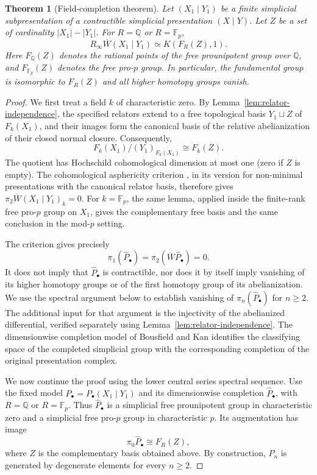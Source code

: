 \documentclass[11pt,a4paper]{article}
\newtheorem{theorem}{Theorem}[section] %
\begin{document}
\begin{theorem}[Field-completion theorem]\label{main}
Let $(X_1\mid Y_1)$ be a finite simplicial subpresentation of a
contractible simplicial presentation $(X\mid Y)$.  Let $Z$ be a set of
cardinality $|X_1|-|Y_1|$.  For $R=\mathbb Q$ or $R=\mathbb F_p$,
\[
 R_\infty\overline W(X_1\mid Y_1)\simeq K(F_R(Z),1).
\]
Here $F_{\mathbb Q}(Z)$ denotes the rational points of the free
prounipotent group over $\mathbb Q$, and $F_{\mathbb F_p}(Z)$ denotes
the free pro-$p$ group.  In particular, the fundamental group is
isomorphic to $F_R(Z)$ and all higher homotopy groups vanish.
\end{theorem}

\begin{proof}
We first treat a field $k$ of characteristic zero.  By
Lemma~\ref{lem:relator-independence}, the specified relators extend to a
free topological basis $Y_1\sqcup Z$ of $F_k(X_1)$, and their images form
the canonical basis of the relative abelianization of their closed normal
closure.  Consequently,
\[
 F_k(X_1)/(Y_1)_{F_k(X_1)}\cong F_k(Z).
\]
The quotient has Hochschild cohomological dimension at most one (zero
if $Z$ is empty).  The cohomological asphericity criterion
\cite[Propositions~15 and~16]{Mikh2023}, in its version for non-minimal
presentations with the canonical relator basis, therefore gives
$\pi_2\overline W(X_1\mid Y_1)_k=0$.
For $k=\mathbb F_p$, the same lemma, applied inside the finite-rank free
pro-$p$ group on $X_1$, gives the complementary free basis and the same
conclusion in the mod-$p$ setting.

The criterion gives precisely
\[
 \pi_1(\widehat P_\bullet)
   =\pi_2(\overline W\widehat P_\bullet)=0.
\]
It does not imply that $\widehat P_\bullet$ is contractible, nor does it
by itself imply vanishing of its higher homotopy groups or of the first
homotopy group of its abelianization.  We use the spectral argument below
to establish vanishing of $\pi_n(\widehat P_\bullet)$ for $n\geq2$.
The additional input for that argument is the injectivity of the
abelianized differential, verified separately using
Lemma~\ref{lem:relator-independence}.
The dimensionwise completion model of Bousfield and Kan identifies the
classifying space of the completed simplicial group with the corresponding
completion of the original presentation complex.

We now continue the proof using the lower central series spectral sequence.
Use the fixed model $P_\bullet=P_\bullet(X_1\mid Y_1)$ and its
dimensionwise completion $\widehat P_\bullet$, with
$R=\mathbb Q$ or $R=\mathbb F_p$.  Thus
$\widehat P_\bullet$ is a simplicial free prounipotent group in characteristic zero
and a simplicial free pro-$p$ group in characteristic $p$.  Its augmentation
has image
\[
 \pi_0\widehat P_\bullet\cong F_R(Z),
\]
where $Z$ is the complementary basis obtained above.  By construction,
$\widehat P_n$ is generated by degenerate elements for every $n\geq2$.


\end{proof}
\end{document}
